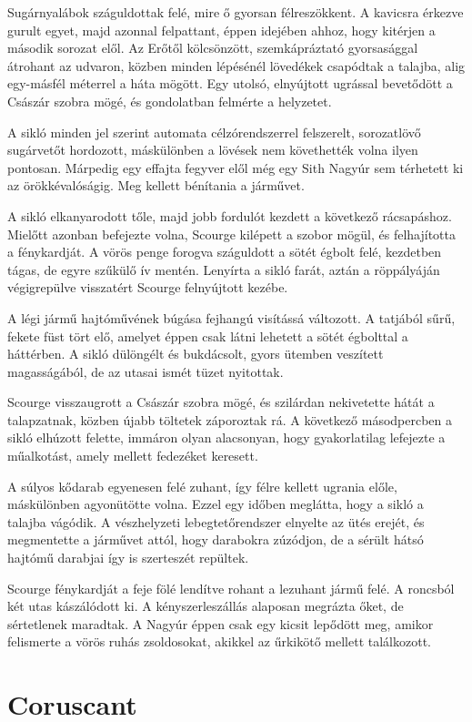 \documentclass{thesis-ekf}
\theoremstyle{definition}
\begin{document}
Sugárnyalábok száguldottak felé, mire ő gyorsan félreszökkent. A kavicsra érkezve gurult
egyet, majd azonnal felpattant, éppen idejében ahhoz, hogy kitérjen a második sorozat elől. Az
Erőtől kölcsönzött, szemkápráztató gyorsasággal átrohant az udvaron, közben minden
lépésénél lövedékek csapódtak a talajba, alig egy-másfél méterrel a háta mögött. Egy utolsó,
elnyújtott ugrással bevetődött a Császár szobra mögé, és gondolatban felmérte a helyzetet.

A sikló minden jel szerint automata célzórendszerrel felszerelt, sorozatlövő sugárvetőt
hordozott, máskülönben a lövések nem követhették volna ilyen pontosan. Márpedig egy effajta
fegyver elől még egy Sith Nagyúr sem térhetett ki az örökkévalóságig. Meg kellett bénítania a
járművet.

A sikló elkanyarodott tőle, majd jobb fordulót kezdett a következő rácsapáshoz. Mielőtt
azonban befejezte volna, Scourge kilépett a szobor mögül, és felhajította a fénykardját. A vörös
penge forogva száguldott a sötét égbolt felé, kezdetben tágas, de egyre szűkülő ív mentén.
Lenyírta a sikló farát, aztán a röppályáján végigrepülve visszatért Scourge felnyújtott kezébe.

A légi jármű hajtóművének búgása fejhangú visítássá változott. A tatjából sűrű, fekete füst tört
elő, amelyet éppen csak látni lehetett a sötét égbolttal a háttérben. A sikló dülöngélt és
bukdácsolt, gyors ütemben veszített magasságából, de az utasai ismét tüzet nyitottak.

Scourge visszaugrott a Császár szobra mögé, és szilárdan nekivetette hátát a talapzatnak,
közben újabb töltetek záporoztak rá. A következő másodpercben a sikló elhúzott felette,
immáron olyan alacsonyan, hogy gyakorlatilag lefejezte a műalkotást, amely mellett fedezéket
keresett.

A súlyos kődarab egyenesen felé zuhant, így félre kellett ugrania előle, máskülönben
agyonütötte volna. Ezzel egy időben meglátta, hogy a sikló a talajba vágódik. A vészhelyzeti
lebegtetőrendszer elnyelte az ütés erejét, és megmentette a járművet attól, hogy darabokra
zúzódjon, de a sérült hátsó hajtómű darabjai így is szerteszét repültek.

Scourge fénykardját a feje fölé lendítve rohant a lezuhant jármű felé. A roncsból két utas
kászálódott ki. A kényszerleszállás alaposan megrázta őket, de sértetlenek maradtak. A
Nagyúr éppen csak egy kicsit lepődött meg, amikor felismerte a vörös ruhás zsoldosokat,
akikkel az űrkikötő mellett találkozott.

\chapter{Coruscant}\label{fejezet-coruscant}
\end{document}
